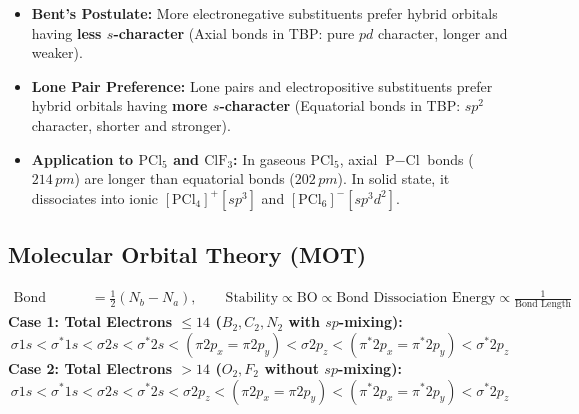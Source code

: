 \documentclass[11pt,a4paper]{article}
\begin{document}
\begin{usecasebox}
\begin{itemize}
  \item \textbf{Bent's Postulate:} More electronegative substituents prefer hybrid orbitals having \textbf{less $s$-character} (Axial bonds in TBP: pure $pd$ character, longer and weaker).
  \item \textbf{Lone Pair Preference:} Lone pairs and electropositive substituents prefer hybrid orbitals having \textbf{more $s$-character} (Equatorial bonds in TBP: $sp^2$ character, shorter and stronger).
  \item \textbf{Application to $\text{PCl}_5$ and $\text{ClF}_3$:} In gaseous $\text{PCl}_5$, axial $\text{P}-\text{Cl}$ bonds ($214\,\si{pm}$) are longer than equatorial bonds ($202\,\si{pm}$). In solid state, it dissociates into ionic $[\text{PCl}_4]^+ [sp^3]$ and $[\text{PCl}_6]^- [sp^3d^2]$.
\end{itemize}
\end{usecasebox}

\subsection{Molecular Orbital Theory (MOT)}

\begin{formulabox}
\begin{align}
  \text{Bond Order (BO)} &= \frac{1}{2}(N_b - N_a), \qquad \text{Stability} \propto \text{BO} \propto \text{Bond Dissociation Energy} \propto \frac{1}{\text{Bond Length}}
\end{align}
\textbf{Case 1: Total Electrons $\le 14$ ($B_2, C_2, N_2$ with $sp$-mixing):}
\begin{equation}
  \sigma 1s < \sigma^* 1s < \sigma 2s < \sigma^* 2s < (\pi 2p_x = \pi 2p_y) < \sigma 2p_z < (\pi^* 2p_x = \pi^* 2p_y) < \sigma^* 2p_z
\end{equation}
\textbf{Case 2: Total Electrons $> 14$ ($O_2, F_2$ without $sp$-mixing):}
\begin{equation}
  \sigma 1s < \sigma^* 1s < \sigma 2s < \sigma^* 2s < \sigma 2p_z < (\pi 2p_x = \pi 2p_y) < (\pi^* 2p_x = \pi^* 2p_y) < \sigma^* 2p_z
\end{equation}
\end{formulabox}
\end{document}
